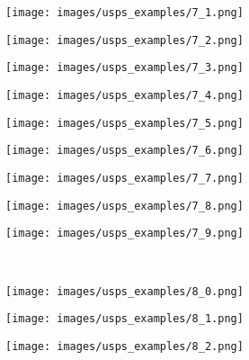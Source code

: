 \begin{figure}[t]
\begin{subfigure}[c]{0.07\textwidth}
  \texttt{[image: images/usps\_examples/7\_1.png]}
 \end{subfigure}
 \begin{subfigure}[c]{0.07\textwidth}
  \centering
  \texttt{[image: images/usps\_examples/7\_2.png]}
 \end{subfigure}
 \begin{subfigure}[c]{0.07\textwidth}
  \centering
  \texttt{[image: images/usps\_examples/7\_3.png]}
 \end{subfigure}
 \begin{subfigure}[c]{0.07\textwidth}
  \centering
  \texttt{[image: images/usps\_examples/7\_4.png]}
 \end{subfigure}
 \begin{subfigure}[c]{0.07\textwidth}
  \centering
  \texttt{[image: images/usps\_examples/7\_5.png]}
 \end{subfigure}
 \begin{subfigure}[c]{0.07\textwidth}
  \centering
  \texttt{[image: images/usps\_examples/7\_6.png]}
 \end{subfigure}
 \begin{subfigure}[c]{0.07\textwidth}
  \centering
  \texttt{[image: images/usps\_examples/7\_7.png]}
 \end{subfigure}
 \begin{subfigure}[c]{0.07\textwidth}
  \centering
  \texttt{[image: images/usps\_examples/7\_8.png]}
 \end{subfigure}
 \begin{subfigure}[c]{0.07\textwidth}
  \centering
  \texttt{[image: images/usps\_examples/7\_9.png]}
 \end{subfigure}
 \\
 \begin{subfigure}[c]{0.07\textwidth}
  \centering
  \texttt{[image: images/usps\_examples/8\_0.png]}
 \end{subfigure}
 \begin{subfigure}[c]{0.07\textwidth}
  \centering
  \texttt{[image: images/usps\_examples/8\_1.png]}
 \end{subfigure}
 \begin{subfigure}[c]{0.07\textwidth}
  \centering
  \texttt{[image: images/usps\_examples/8\_2.png]}
 \end{subfigure}
 \begin{subfigure}[c]{0.07\textwidth}

\end{subfigure}
\end{figure}
